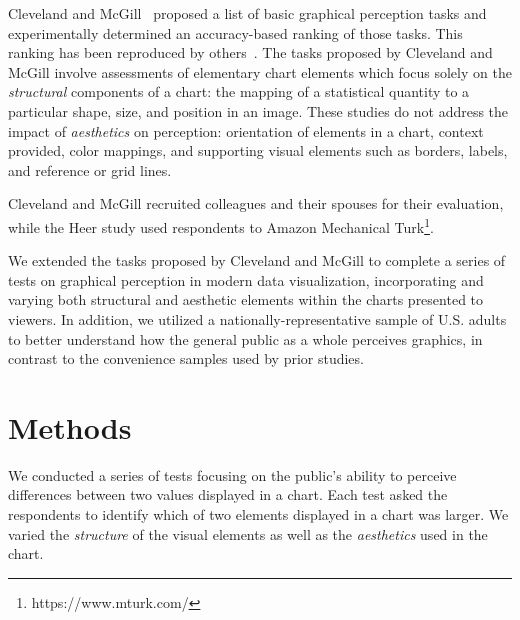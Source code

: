 \documentclass[10pt]{article}\usepackage[]{graphicx}\usepackage[table]{xcolor}
\begin{document}


Cleveland and McGill~ proposed a list of basic graphical perception tasks and experimentally determined an accuracy-based ranking of those tasks. This ranking has been reproduced by others~\cite{heer}. The tasks proposed by Cleveland and McGill involve assessments of elementary chart elements which focus solely on the \textit{structural} components of a chart: the mapping of a statistical quantity to a particular shape, size, and position in an image. These studies do not address the impact of \textit{aesthetics} on perception: orientation of elements in a chart, context provided, color mappings, and supporting visual elements such as borders, labels, and reference or grid lines. 

Cleveland and McGill recruited colleagues and their spouses for their evaluation, while the Heer study used respondents to Amazon Mechanical Turk\footnote{https://www.mturk.com/}. 

We extended the tasks proposed by Cleveland and McGill to complete a series of tests on graphical perception in modern data visualization, incorporating and varying both structural and aesthetic elements within the charts presented to viewers. In addition, we utilized a nationally-representative sample of U.S. adults to better understand how the general public as a whole perceives graphics, in contrast to the convenience samples used by prior studies.  





\section{Methods}

We conducted a series of tests focusing on the public's ability to perceive differences between two values displayed in a chart. Each test asked the respondents to identify which of two elements displayed in a chart was larger. We varied the \textit{structure} of the visual elements as well as the \textit{aesthetics} used in the chart. 
\end{document}
